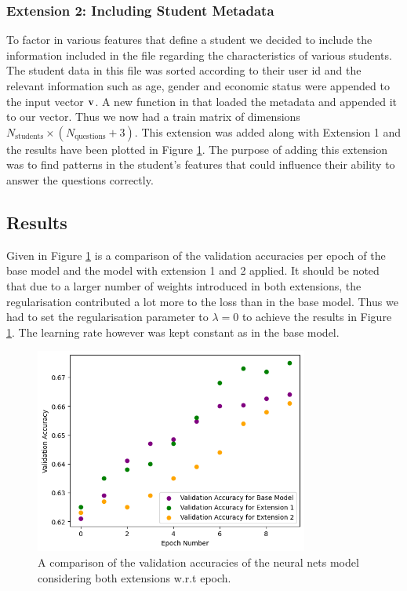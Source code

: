 \documentclass{article}
\begin{document}
\subsubsection*{Extension 2: Including Student Metadata}
To factor in various features that define a student we decided to include the information included in the  file regarding the characteristics of various students. The student data in this file was sorted according to their user id and the relevant information such as age, gender and economic status were appended to the input vector $\bold{v}$. A new function  in  that loaded the metadata and appended it to our vector. Thus we now had a train matrix of dimensions $N_{\text{students}}\times (N_{\text{questions}}+3)$. This extension was added along with Extension 1 and the results have been plotted in Figure \ref{fig:extended models}. The purpose of adding this extension was to find patterns in the student's features that could influence their ability to answer the questions correctly.

\subsection*{Results}
Given in Figure \ref{fig:extended models} is a comparison of the validation accuracies per epoch of the base model and the model with extension 1 and 2 applied. It should be noted that due to a larger number of weights introduced in both extensions, the regularisation contributed a lot more to the loss than in the base model. Thus we had to set the regularisation parameter to $\lambda=0$ to achieve the results in Figure \ref{fig:extended models}. The learning rate however was kept constant as in the base model.

\begin{figure}[H]
    \centering
    \includegraphics[width=9cm]{extended accuracy.png}
    \caption{A comparison of the validation accuracies of the neural nets model considering both extensions w.r.t epoch.}
    \label{fig:extended models}
\end{figure}
\end{document}
